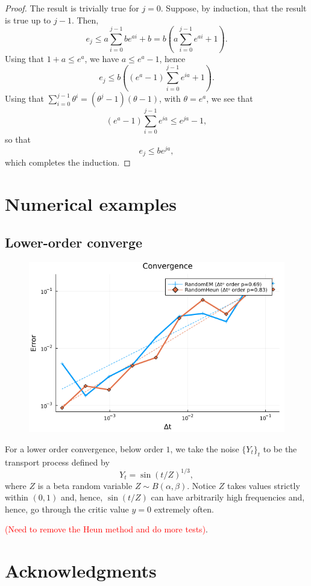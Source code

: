 \documentclass[reqno,12pt]{amsart}
\theoremstyle{plain}%
\theoremstyle{definition}
\begin{document}
\begin{proof}
  The result is trivially true for $j=0$. Suppose, by induction, that the result is true up to $j-1$. Then,
  $$
  e_j \leq a \sum_{i=0}^{j-1} be^{ai} + b = b \left(a \sum_{i=0}^{j-1} e^{ai} + 1\right).
  $$
  Using that $1 + a \leq e^a$, we have $a \leq e^a - 1$, hence
  $$
  e_j \leq b\left((e^a - 1)\sum_{i=0}^{j-1} e^{ia} + 1\right).
  $$
  Using that $\sum_{i=0}^{j-1} \theta^i = (\theta^j - 1)(\theta - 1)$, with $\theta = e^a$, we see that
  $$
  (e^a - 1)\sum_{i=0}^{j-1} e^{ia} \leq e^{ja} - 1,
  $$
  so that
  $$
  e_j \leq be^{ja},
  $$
  which completes the induction.
\end{proof}

\section{Numerical examples}

\subsection{Lower-order converge}

\begin{figure}
  \includegraphics{img/plot_13.png}
\end{figure}

For a lower order convergence, below order $1$, we take the noise $\{Y_t\}_t$ to be the transport process defined by
$$
Y_t = \sin(t/Z)^{1/3},
$$
where $Z$ is a beta random variable $Z \sim B(\alpha, \beta)$. Notice $Z$ takes values strictly within $(0, 1)$ and, hence, $\sin(t/Z)$ can have arbitrarily high frequencies and, hence, go through the critic value $y = 0$ extremely often.

\textcolor{red}{(Need to remove the Heun method and do more tests)}.

\section*{Acknowledgments}


\begin{thebibliography}{25}


\end{thebibliography}
\end{document}

